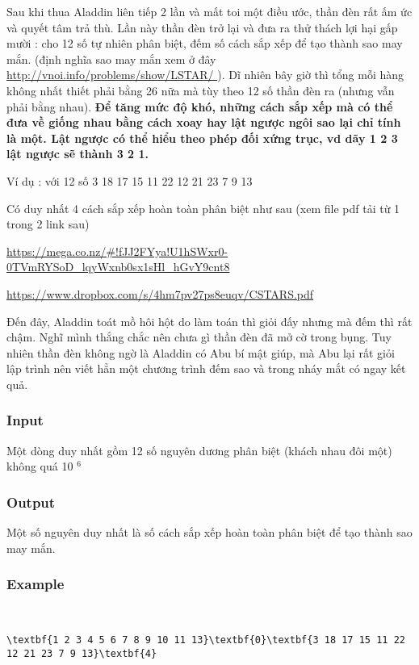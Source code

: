 

Sau khi thua Aladdin liên tiếp 2 lần và mất toi một điều ước, thần đèn rất ấm ức và quyết tâm trả thù. Lần này thần đèn trở lại và đưa ra thử thách lợi hại gấp mười : cho 12 số tự nhiên phân biệt, đếm số cách sắp xếp để tạo thành sao may mắn. (định nghĩa sao may mắn xem ở đây \href{http://vnoi.info/problems/show/LSTAR/}{ http://vnoi.info/problems/show/LSTAR/ } ). Dĩ nhiên bây giờ thì tổng mỗi hàng không nhất thiết phải bằng 26 nữa mà tùy theo 12 số thần đèn ra (nhưng vẫn phải bằng nhau). \textbf{ Để tăng mức độ khó, những cách sắp xếp mà có thể đưa về giống nhau bằng cách xoay hay lật ngược ngôi sao lại chỉ tính là một. Lật ngược có thể hiểu theo phép đối xứng trục, vd dãy 1 2 3 lật ngược sẽ thành 3 2 1. }

Ví dụ : với 12 số 3 18 17 15 11 22 12 21 23 7 9 13

Có duy nhất 4 cách sắp xếp hoàn toàn phân biệt như sau (xem file pdf tải từ 1 trong 2 link sau)

\href{https://mega.co.nz/#!fJJ2FYya!U1hSWxr0-0TVmRYSoD_lqyWxnb0sx1sHl_hGvY9cnt8}{https://mega.co.nz/\#!fJJ2FYya!U1hSWxr0-0TVmRYSoD\_lqyWxnb0sx1sHl\_hGvY9cnt8 }

\href{https://www.dropbox.com/s/4hm7pv27ps8euqv/CSTARS.pdf}{https://www.dropbox.com/s/4hm7pv27ps8euqv/CSTARS.pdf }

Đến đây, Aladdin toát mồ hôi hột do làm toán thì giỏi đấy nhưng mà đếm thì rất chậm. Nghĩ mình thắng chắc nên chưa gì thần đèn đã mở cờ trong bụng. Tuy nhiên thần đèn không ngờ là Aladdin có Abu bí mật giúp, mà Abu lại rất giỏi lập trình nên viết hẳn một chương trình đếm sao và trong nháy mắt có ngay kết quả.

\subsubsection{Input}

Một dòng duy nhất gồm 12 số nguyên dương phân biệt (khách nhau đôi một) không quá 10 $^ 6 $

\subsubsection{Output}

Một số nguyên duy nhất là số cách sắp xếp hoàn toàn phân biệt để tạo thành sao may mắn.

\subsubsection{Example}

 
\begin{verbatim}
\textbf{1 2 3 4 5 6 7 8 9 10 11 13}\textbf{0}\textbf{3 18 17 15 11 22 12 21 23 7 9 13}\textbf{4}\end{verbatim}
